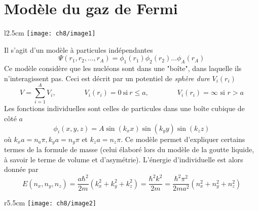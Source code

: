 \section{Modèle du gaz de Fermi}
	\begin{wrapfigure}[9]{l}{2.5cm}
	\vspace{-5mm}
	\texttt{[image: ch8/image1]}
	\end{wrapfigure}
Il s'agit d'un modèle à particules indépendantes
\begin{equation}
\Psi(r_1,r_2,\dots, r_A) = \phi_1(r_1)\phi_2(r_2)\dots\phi_A(r_A)
\end{equation}
Ce modèle considère que les nucléons sont dans une "boîte", dans laquelle ils n'interagissent pas. Ceci est 
décrit par un potentiel de \textit{sphère dure} $V_i(r_i)$
\begin{equation}
V=\sum_{i=1}^A V_i, \qquad\qquad V_i(r_i)=0\ \text{si}\ r\leq a,\qquad\qquad V_i(r_i)=\infty\text{ si }r>a
\end{equation}
Les fonctions individuelles sont celles de particules dans une boîte cubique de côté $a$ 
\begin{equation}
\phi_i(x,y,z) = A\sin(k_xx)\sin(k_yy)\sin(k_zz)
\end{equation}
où $k_xa=n_a\pi,k_ya=n_y\pi$ et $k_za=n_z\pi$. Ce modèle permet d'expliquer certains termes de la formule de 
masse (celui élaboré lors du modèle de la goutte liquide, à savoir le terme de volume et d'asymétrie). 
L'énergie d'individuelle est alors donnée par
\begin{equation}
E(n_x,n_y,n_z) = \frac{a\hbar^2}{2m}(k_x^2+k_y^2+k_z^2) = \frac{\hbar^2k^2}{2m} = \frac{\hbar^2\pi^2}{2ma^2}
(n_x^2+n_y^2+n_z^2)
\end{equation}

\newpage
	\begin{wrapfigure}[11]{r}{5.5cm}
	\vspace{-5mm}
	\texttt{[image: ch8/image2]}
	\end{wrapfigure}
	
